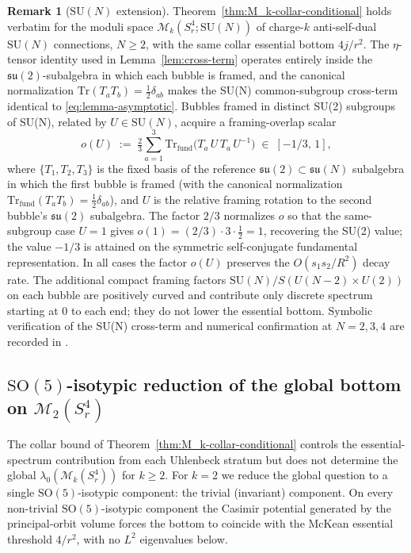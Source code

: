 \documentclass[11pt,letterpaper]{article}
\theoremstyle{definition}
\newtheorem{remark}[theorem]{Remark}
\newcommand{\cM}{\mathcal{M}}
\begin{document}
\begin{remark}[$\mathrm{SU}(N)$ extension]\label{rmk:SUN}
Theorem~\ref{thm:M_k-collar-conditional} holds verbatim for the moduli space $\cM_k(S^4_r; \mathrm{SU}(N))$ of charge-$k$ anti-self-dual $\mathrm{SU}(N)$ connections, $N \ge 2$, with the same collar essential bottom $4j/r^2$. The $\eta$-tensor identity used in Lemma~\ref{lem:cross-term} operates entirely inside the $\mathfrak{su}(2)$-subalgebra in which each bubble is framed, and the canonical normalization $\mathrm{Tr}(T_a T_b) = \tfrac12\delta_{ab}$ makes the SU(N) common-subgroup cross-term identical to \eqref{eq:lemma-asymptotic}. Bubbles framed in distinct SU(2) subgroups of SU(N), related by $U \in \mathrm{SU}(N)$, acquire a framing-overlap scalar
\[
o(U) \;:=\; \tfrac{2}{3}\sum_{a=1}^{3} \mathrm{Tr}_{\mathrm{fund}}\bigl(T_a\,U\,T_a\,U^{-1}\bigr) \;\in\; [-1/3,\,1],
\]
where $\{T_1, T_2, T_3\}$ is the fixed basis of the reference $\mathfrak{su}(2) \subset \mathfrak{su}(N)$ subalgebra in which the first bubble is framed (with the canonical normalization $\mathrm{Tr}_{\mathrm{fund}}(T_a T_b) = \tfrac12\delta_{ab}$), and $U$ is the relative framing rotation to the second bubble's $\mathfrak{su}(2)$ subalgebra. The factor $2/3$ normalizes $o$ so that the same-subgroup case $U = 1$ gives $o(1) = (2/3)\cdot 3 \cdot \tfrac12 = 1$, recovering the SU(2) value; the value $-1/3$ is attained on the symmetric self-conjugate fundamental representation. In all cases the factor $o(U)$ preserves the $O(s_1 s_2/R^2)$ decay rate. The additional compact framing factors $\mathrm{SU}(N)/S(U(N{-}2)\times U(2))$ on each bubble are positively curved and contribute only discrete spectrum starting at $0$ to each end; they do not lower the essential bottom. Symbolic verification of the SU(N) cross-term and numerical confirmation at $N=2,3,4$ are recorded in \cite{lemma-ct-SUN}.
\end{remark}

\iffalse
\subsection{$\mathrm{SO}(5)$-isotypic reduction of the global bottom on $\cM_2(S^4_r)$}\label{sec:isotypic}

The collar bound of Theorem~\ref{thm:M_k-collar-conditional} controls the essential-spectrum contribution from each Uhlenbeck stratum but does not determine the global $\lambda_0(\cM_k(S^4_r))$ for $k \ge 2$. For $k=2$ we reduce the global question to a single $\mathrm{SO}(5)$-isotypic component: the trivial (invariant) component. On every non-trivial $\mathrm{SO}(5)$-isotypic component the Casimir potential generated by the principal-orbit volume forces the bottom to coincide with the McKean essential threshold $4/r^2$, with no $L^2$ eigenvalues below.
\end{document}
